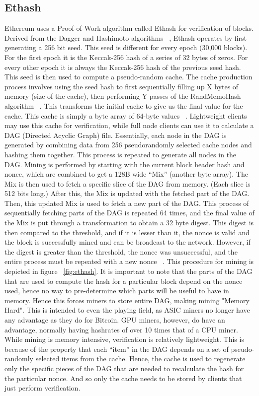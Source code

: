 \documentclass[10pt, conference, compsocconf]{IEEEtran}
\begin{document}
\subsection{Ethash}
Ethereum uses a Proof-of-Work algorithm called Ethash for verification of blocks. Derived from the Dagger and Hashimoto algorithms ~\cite{dagger-hashimoto}, Ethash operates by first generating a 256 bit seed. This seed is different for every epoch (30,000 blocks). For the first epoch it is the Keccak-256 hash of a series of 32 bytes of zeros. For every other epoch it is always the Keccak-256 hash of the previous seed hash. This seed is then used to compute a pseudo-random cache. The cache production process involves using the seed hash to first sequentially filling up X bytes of memory (size of the cache), then performing Y passes of the RandMemoHash algorithm ~\cite{randmemohash}. This transforms the initial cache to give us the final value for the cache. This cache is simply a byte array of 64-byte values ~\cite{Ethmining}. Lightweight clients may use this cache for verification, while full node clients can use it to calculate a DAG (Directed Acyclic Graph) file. Essentially, each node in the DAG is generated by combining data from 256 pseudorandomly selected cache nodes and hashing them together. This process is repeated to generate all nodes in the DAG. Mining is performed by starting with the current block header hash and nonce, which are combined to get a 128B wide “Mix” (another byte array). The Mix is then used to fetch a specific slice of the DAG from memory. (Each slice is 512 bits long.) After this, the Mix is updated with the fetched part of the DAG. Then, this updated Mix is used to fetch a new part of the DAG. This process of sequentially fetching parts of the DAG is repeated 64 times, and the final value of the Mix is put through a transformation to obtain a 32 byte digest. This digest is then compared to the threshold, and if it is lesser than it, the nonce is valid and the block is successfully mined and can be broadcast to the network. However, if the digest is greater than the threshold, the nonce was unsuccessful, and the entire process must be repeated with a new nonce ~\cite{Ethmining}. This procedure for mining is depicted in figure ~\ref{fig:ethash}. It is important to note that the parts of the DAG that are used to compute the hash for a particular block depend on the nonce used, hence no way to pre-determine which parts will be useful to have in memory. Hence this forces miners to store entire DAG, making mining "Memory Hard". This is intended to even the playing field, as ASIC miners no longer have any advantage as they do for Bitcoin. GPU miners, however, do have an advantage, normally having hashrates of over 10 times that of a CPU miner.
While mining is memory intensive, verification is relatively lightweight. This is because of the property that each ``item'' in the DAG depends on a set of pseudo-randomly selected items from the cache. Hence, the cache is used to regenerate only the specific pieces of the DAG that are needed to recalculate the hash for the particular nonce. And so only the cache needs to be stored by clients that just perform verification.
\end{document}
